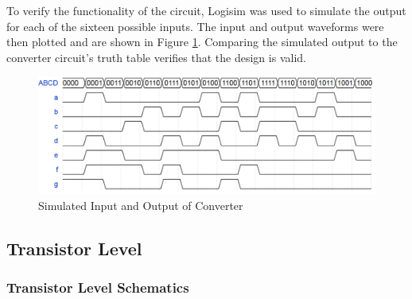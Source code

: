 \documentclass[12pt]{article}
\begin{document}
To verify the functionality of the circuit, Logisim was used to simulate the output for each of the sixteen possible inputs.
The input and output waveforms were then plotted and are shown in Figure \ref{fig:BCD_sim}.
Comparing the simulated output to the converter circuit's truth table verifies that the design is valid.



\begin{figure}[H]
	\centering
	\includegraphics[width=\linewidth, keepaspectratio]{BCD_sim_waveform.png}
	\caption{Simulated Input and Output of Converter}
	\label{fig:BCD_sim}
\end{figure}

\subsection{Transistor Level}

\subsubsection{Transistor Level Schematics}
\end{document}

